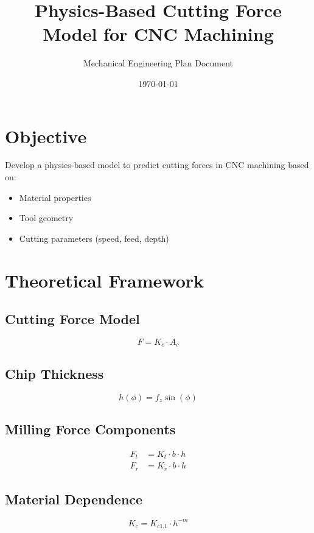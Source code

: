 \documentclass[11pt]{article}
\title{Physics-Based Cutting Force Model for CNC Machining}
\author{Mechanical Engineering Plan Document}
\date{\today}
\begin{document}
\maketitle

\section{Objective}
Develop a physics-based model to predict cutting forces in CNC machining based on:
\begin{itemize}
    \item Material properties
    \item Tool geometry
    \item Cutting parameters (speed, feed, depth)
\end{itemize}

\section{Theoretical Framework}

\subsection{Cutting Force Model}
\begin{equation}
F = K_c \cdot A_c
\end{equation}

\subsection{Chip Thickness}
\begin{equation}
h(\phi) = f_z \sin(\phi)
\end{equation}

\subsection{Milling Force Components}
\begin{align}
F_t &= K_t \cdot b \cdot h \\
F_r &= K_r \cdot b \cdot h
\end{align}

\subsection{Material Dependence}
\begin{equation}
K_c = K_{c1.1} \cdot h^{-m}
\end{equation}
\end{document}
